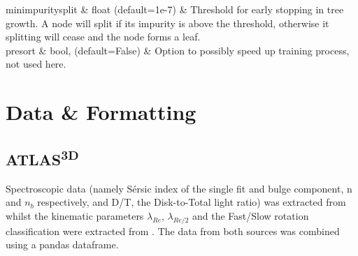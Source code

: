 \begin{table}[H]
\begin{tabu}
	\hline
	min\textunderscore impurity\textunderscore split & float (default=1e-7) & Threshold for early stopping in tree growth. A node will split if its impurity is above the threshold, otherwise it splitting will cease and the node forms a leaf.\\
	\hline
	presort & bool, (default=False) & Option to possibly speed up training process, not used here.\\
	\hline
\end{tabu}
\end{table}

\section{Data \& Formatting}
\subsection{ATLAS\textsuperscript{3D}}
Spectroscopic data (namely S\'ersic index of the single fit and bulge component, n and $n_{b}$ respectively,  and D/T, the Disk-to-Total light ratio) was extracted from \cite{Krajnovic2013} whilst the kinematic parameters $\lambda_{Re}$, $\lambda_{Re/2}$ and the Fast/Slow rotation classification were extracted from \cite{Emsellem2011}. The data from both sources was combined using a pandas dataframe. 
